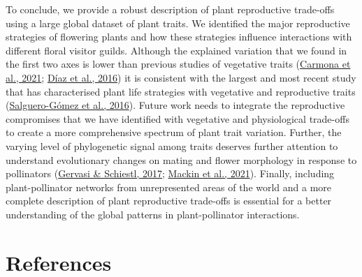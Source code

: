 \documentclass[
  12pt,
  a4paper,
]{article}
\begin{document}
To conclude, we provide a robust description of plant reproductive trade-offs using a large global dataset of plant traits. We identified the major reproductive strategies of flowering plants and how these strategies influence interactions with different floral visitor guilds. Although the explained variation that we found in the first two axes is lower than previous studies of vegetative traits (\protect\hyperlink{ref-carmona2021}{Carmona et al., 2021}; \protect\hyperlink{ref-diaz2016}{Díaz et al., 2016}) it is consistent with the largest and most recent study that has characterised plant life strategies with vegetative and reproductive traits (\protect\hyperlink{ref-salguero2016}{Salguero-Gómez et al., 2016}). Future work needs to integrate the reproductive compromises that we have identified with vegetative and physiological trade-offs to create a more comprehensive spectrum of plant trait variation. Further, the varying level of phylogenetic signal among traits deserves further attention to understand evolutionary changes on mating and flower morphology in response to pollinators (\protect\hyperlink{ref-gervasi2017}{Gervasi \& Schiestl, 2017}; \protect\hyperlink{ref-mackin2021}{Mackin et al., 2021}). Finally, including plant-pollinator networks from unrepresented areas of the world and a more complete description of plant reproductive trade-offs is essential for a better understanding of the global patterns in plant-pollinator interactions.

\hypertarget{references}{%
\section{References}\label{references}}
\end{document}
